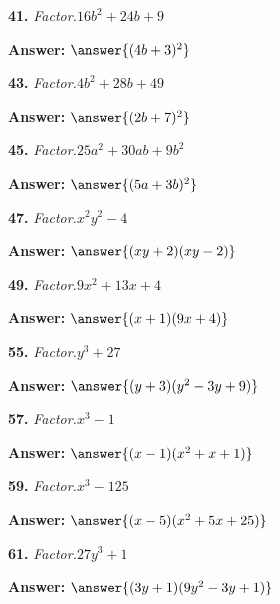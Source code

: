 \documentclass{ximera}
\begin{document}
\begin{problem}
\textbf{41.} \emph{Factor.}\quad $16b^2 + 24b + 9$

\textbf{Answer:} $\answer{(4b +3)^2}$
\end{problem}

\begin{problem}
\textbf{43.} \emph{Factor.}\quad $4b^2 + 28b + 49$

\textbf{Answer:} $\answer{(2b +7)^2}$
\end{problem}

\begin{problem}
\textbf{45.} \emph{Factor.}\quad $25a^2 + 30ab + 9b^2$

\textbf{Answer:} $\answer{(5a +3b)^2}$
\end{problem}

\begin{problem}
\textbf{47.} \emph{Factor.}\quad $x^2y^2 - 4$

\textbf{Answer:} $\answer{(xy +2)(xy -2)}$
\end{problem}

\begin{problem}
\textbf{49.} \emph{Factor.}\quad $9x^2 + 13x + 4$

\textbf{Answer:} $\answer{(x +1)(9x +4)}$
\end{problem}

\begin{problem}
\textbf{55.} \emph{Factor.}\quad $y^3 + 27$

\textbf{Answer:} $\answer{(y +3)(y^2 -3y +9)}$
\end{problem}

\begin{problem}
\textbf{57.} \emph{Factor.}\quad $x^3 - 1$

\textbf{Answer:} $\answer{(x -1)(x^2 +x +1)}$
\end{problem}

\begin{problem}
\textbf{59.} \emph{Factor.}\quad $x^3 - 125$

\textbf{Answer:} $\answer{(x -5)(x^2 +5x +25)}$
\end{problem}

\begin{problem}
\textbf{61.} \emph{Factor.}\quad $27y^3 + 1$

\textbf{Answer:} $\answer{(3y +1)(9y^2 -3y +1)}$
\end{problem}
\end{document}
